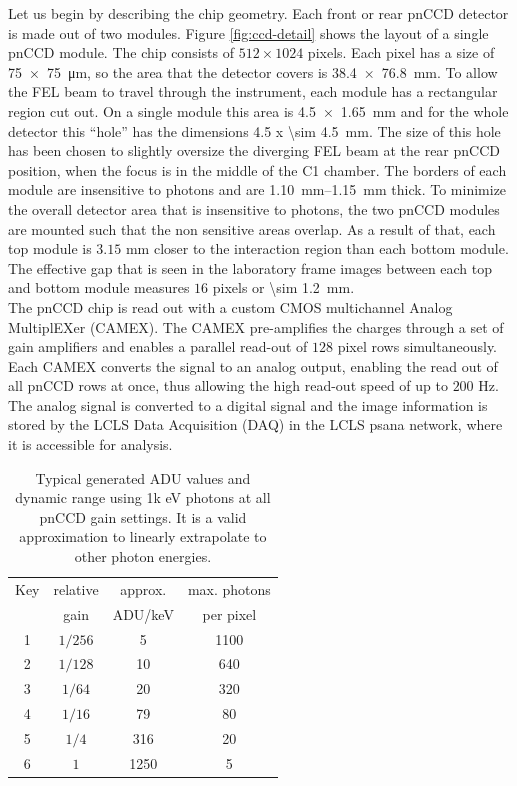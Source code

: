 Let us begin by describing the chip geometry. Each front or rear pnCCD detector is made out of two modules. Figure \ref{fig:ccd-detail} shows the layout of a single pnCCD module. The chip consists of $512 \times 1024$ pixels. Each pixel has a size of \SI{75 x 75}{\micro\meter}, so the area that the detector covers is \SI{38.4 x 76.8}{\milli\meter}. To allow the FEL beam to travel through the instrument, each module has a rectangular region cut out. On a single module this area is \SI{4.5 x 1.65}{\milli\meter} and for the whole detector this ``hole'' has the dimensions \SI{4.5 x \sim 4.5}{\milli\meter}. The size of this hole has been chosen to slightly oversize the diverging FEL beam at the rear pnCCD position, when the focus is in the middle of the C1 chamber. The borders of each module are insensitive to photons and are \SIrange{1.10}{1.15}{\milli\meter} thick. To minimize the overall detector area that is insensitive to photons, the two pnCCD modules are mounted such that the non sensitive areas overlap. As a result of that, each top module is $3.15$ mm closer to the interaction region than each bottom module. The effective gap that is seen in the laboratory frame images between each top and bottom module measures $16$ pixels or \SI{\sim 1.2}{\milli\meter}.\\[1\baselineskip]
%
The pnCCD chip is read out with a custom CMOS multichannel Analog MultiplEXer (CAMEX). The CAMEX pre-amplifies the charges through a set of gain amplifiers and enables a parallel read-out of $128$ pixel rows simultaneously. Each CAMEX converts the signal to an analog output, enabling the read out of all pnCCD rows at once, thus allowing the high read-out speed of up to $200$ Hz. The analog signal is converted to a digital signal and the image information is stored by the LCLS Data Acquisition (DAQ) in the LCLS psana network, where it is accessible for analysis.\\[1\baselineskip]
\begin{table}%
\centering
\begin{tabular}{ |c c c c |}
 \hline
 Key & relative  & approx.  & max. photons \\ 
     &   gain    & ADU/keV  & per pixel  \\
 \hline
 1 & $1/256$ & 5 & 1100  \\
 2 & $1/128$ & 10 & 640   \\
 3 & $1/64$ & 20 & 320   \\
 4 & $1/16$ & 79 & 80  \\
 5 & $1/4$ & 316 & 20  \\
 6 & $1$ & 1250 & 5  \\
 \hline
\end{tabular}
\caption[pnCCD gain modes and typical ADU values at 1k eV photons.]{Typical generated ADU values and dynamic range using 1k eV photons at all pnCCD gain settings. It is a valid approximation to linearly extrapolate to other photon energies.}
\label{tab:gain-modes}
\end{table}
